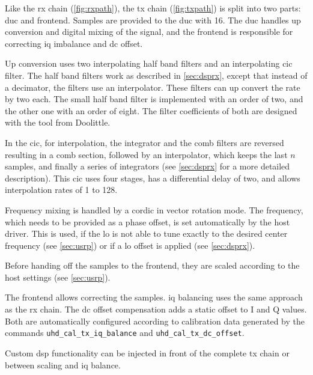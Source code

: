 \documentclass[12pt,a4paper,parskip=full,abstracton]{scrartcl}
\begin{document}
Like the \gls{rx} chain (\cref{fig:rxpath}), the \gls{tx} chain (\cref{fig:txpath})
is split into two parts: \gls{duc} and frontend. Samples are provided to the \gls{duc}
with \SI{16}{\bit}. The \gls{duc} handles up conversion and digital mixing of the signal,
and the frontend is responsible for correcting \gls{iq} imbalance and \gls{dc} offset.

Up conversion uses two interpolating half band filters and an interpolating \gls{cic}
filter. The half band filters work as described in \cref{sec:dsprx}, except that
instead of a decimator, the filters use an interpolator. These filters can up
convert the rate by two each. The small half band filter is implemented with an order of two,
and the other one with an order of eight. The filter coefficients of both are designed
with the tool from Doolittle\cite{halfband}.

In the \gls{cic}, for interpolation, the integrator and the comb filters are reversed resulting in
a comb section, followed by an interpolator, which keeps the last $n$ samples,
and finally a series of integrators (see \cref{sec:dsprx} for a more detailed
description). This \gls{cic} uses four stages, has a differential delay of two,
and allows interpolation rates of 1 to 128.

Frequency mixing is handled by a \gls{cordic} in vector rotation mode. The frequency,
which needs to be provided as a phase offset, is set automatically by the host driver.
This is used, if the \gls{lo} is not able to tune exactly to the desired center frequency
(see \cref{sec:usrp}) or if a \gls{lo} offset is applied (see \cref{sec:dsprx}).

Before handing off the samples to the frontend, they are scaled according to the
host settings (see \cref{sec:usrp}).

The frontend allows correcting the samples. \Gls{iq} balancing uses the same
approach as the \gls{rx} chain. The \gls{dc} offset compensation adds a
static offset to I and Q values. Both are automatically configured according
to calibration data generated by the commands
\verb+uhd_cal_tx_iq_balance+ and \verb+uhd_cal_tx_dc_offset+\cite{usrp_cal}.

Custom \gls{dsp} functionality can be injected in front of the complete \gls{tx} chain or between
scaling and \gls{iq} balance.

\end{document}
